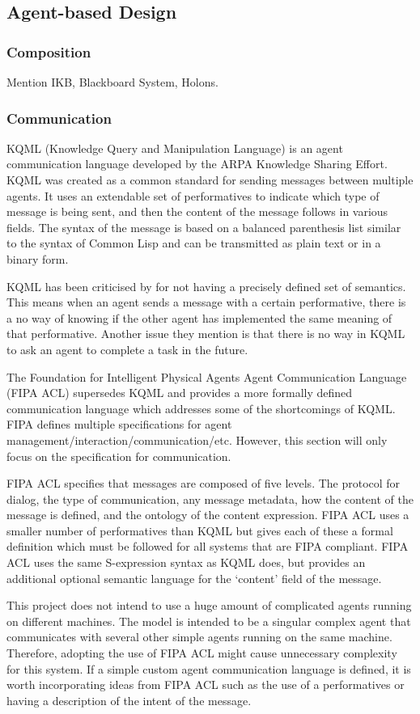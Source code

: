 \subsection{Agent-based Design}

\subsubsection{Composition}

Mention IKB, Blackboard System, Holons.

\subsubsection{Communication}

KQML (Knowledge Query and Manipulation Language) is an agent communication language developed by the ARPA Knowledge Sharing Effort.
KQML was created as a common standard for sending messages between multiple agents.
It uses an extendable set of performatives to indicate which type of message is being sent, and then the content of the message follows in various fields.
The syntax of the message is based on a balanced parenthesis list similar to the syntax of Common Lisp and can be transmitted as plain text or in a binary form.~\cite{finin1994kqml}

KQML has been criticised by  for not having a precisely defined set of semantics.
This means when an agent sends a message with a certain performative, there is a no way of knowing if the other agent has implemented the same meaning of that performative.
Another issue they mention is that there is no way in KQML to ask an agent to complete a task in the future.

The Foundation for Intelligent Physical Agents Agent Communication Language (FIPA ACL) supersedes KQML and provides a more formally defined communication language which addresses some of the shortcomings of KQML\@.
FIPA defines multiple specifications for agent management/interaction/communication/etc.
However, this section will only focus on the specification for communication.

FIPA ACL specifies that messages are composed of five levels.
The protocol for dialog, the type of communication, any message metadata, how the content of the message is defined, and the ontology of the content expression.
FIPA ACL uses a smaller number of performatives than KQML but gives each of these a formal definition which must be followed for all systems that are FIPA compliant.
FIPA ACL uses the same S-expression syntax as KQML does, but provides an additional optional semantic language for the `content' field of the message.~\cite{obrien1998fipa}

This project does not intend to use a huge amount of complicated agents running on different machines.
The model is intended to be a singular complex agent that communicates with several other simple agents running on the same machine.
Therefore, adopting the use of FIPA ACL might cause unnecessary complexity for this system.
If a simple custom agent communication language is defined, it is worth incorporating ideas from FIPA ACL such as the use of a performatives or having a description of the intent of the message.
